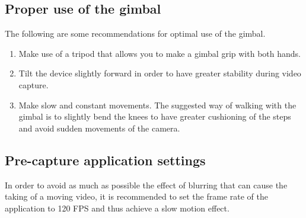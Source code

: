 \subsection{Proper use of the gimbal}

The following are some recommendations for optimal use of the gimbal.

\begin{enumerate}
 \item Make use of a tripod that allows you to make a gimbal grip with both hands.
 \item Tilt the device slightly forward in order to have greater stability during video capture.
 \item Make slow and constant movements. The suggested way of walking with the gimbal is to slightly bend the knees to have greater cushioning of the steps and avoid sudden movements of the camera.
\end{enumerate}

\subsection{Pre-capture application settings}

In order to avoid as much as possible the effect of blurring that can cause the taking of a moving video, it is recommended to set the frame rate of the application to 120 FPS and thus achieve a slow motion effect.

